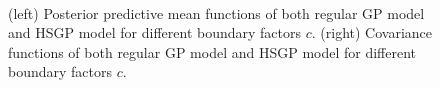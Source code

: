 \documentclass[]{interact}
\theoremstyle{plain}%
\theoremstyle{definition}
\theoremstyle{remark}
\begin{document}
\begin{figure}
\\
\vspace{-3mm}
\caption{(left) Posterior predictive mean functions of both regular GP model and HSGP model for different boundary factors $c$. (right) Covariance functions of both regular GP model and HSGP model for different boundary factors $c$.}
  \label{fig4_Post_part1}
\end{figure}
\end{document}
